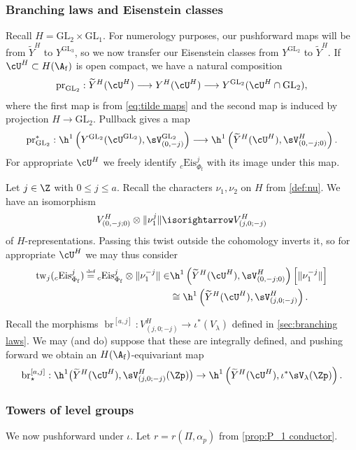\documentclass[10pt,reqno,a4paper]{amsart}
\newcommand{\Phif}{{\Phi\subf}}
\newcommand{\LSk}{\sV_{(0,-j)}^{\GL_2}}
\newcommand{\subf}{_{\mathrm{f}}}
\newcommand{\GL}{\mathrm{GL}}
\begin{document}
\subsubsection{Branching laws and Eisenstein classes}\label{sec:construction branching}
Recall $H = \GL_2 \times \GL_1$. For numerology purposes, our pushforward maps will be from $\widetilde{Y}^H$ to $Y^{\GL_3}$, so we now transfer our Eisenstein classes from $Y^{\GL_2}$ to $\widetilde{Y}^H$. If $\cU^H \subset H(\A\subf)$ is open compact, we have a natural composition
\[
\mathrm{pr}_{\GL_2} : \widetilde{Y}^H(\cU^H) \longrightarrow Y^H(\cU^H) \longrightarrow Y^{\GL_2}(\cU^{H}\cap \GL_2),
\]
where the first map is from \eqref{eq:tilde maps} and the second map is induced by projection $H \to \GL_2$.
Pullback gives a map
\[
\mathrm{pr}_{\GL_2}^* : \h^1\left(Y^{\GL_2}(\cU^{\GL_2}), \LSk\right) \longrightarrow \h^1\left(\widetilde{Y}^H(\cU^H), \sV^H_{(0,-j;0)}\right).
\]
For appropriate $\cU^H$ we freely identify ${}_c\mathrm{Eis}^j_\Phif$ with its image under this map.



Let $j \in \Z$ with $0 \le j \le a$. Recall the characters $\nu_1,\nu_2$ on $H$ from \cref{def:nu}. We have an isomorphism
\[
V_{(0,-j;0)}^H \otimes \|\nu_1^j\| \isorightarrow V_{(j,0;-j)}^H
\]
of $H$-representations. Passing this twist outside the cohomology inverts it, so for appropriate $\cU^H$ we may thus consider
\begin{align*}
\mathrm{tw}_j({}_c\mathrm{Eis}_\Phif^j) \defeq {}_c\mathrm{Eis}_\Phif^j \otimes \| \nu_1^{-j}\| \in &\h^1\left(\widetilde{Y}^H(\cU^H),\sV^H_{(0,-j;0)}\right)\left[\|\nu_1^{-j}\|\right]\\
& \cong \h^1\left(\widetilde{Y}^H(\cU^H),\sV^H_{(j,0;-j)}\right).
\end{align*}

Recall the morphisms $\operatorname{br}^{[a,j]} :  V^H_{(j, 0; -j)}\to \iota^*(V_\lambda)$ defined in \cref{sec:branching laws}. We may (and do) suppose that these are integrally defined, and pushing forward we obtain an $H(\A\subf)$-equivariant map
\[
\mathrm{br}^{[a,j]}_\star : \h^1\big(\widetilde{Y}^H(\cU^H), \sV_{(j,0;-j)}^H(\Zp)\big) \to \h^1\left(\widetilde{Y}^H(\cU^{H}), \iota^*\sV_{\lambda}(\Zp)\right).
\]



\subsubsection{Towers of level groups} \label{sec:level tower} We now pushforward under $\iota$.  Let $r = r(\Pi,\alpha_p)$ from \cref{prop:P_1 conductor}.
\end{document}
